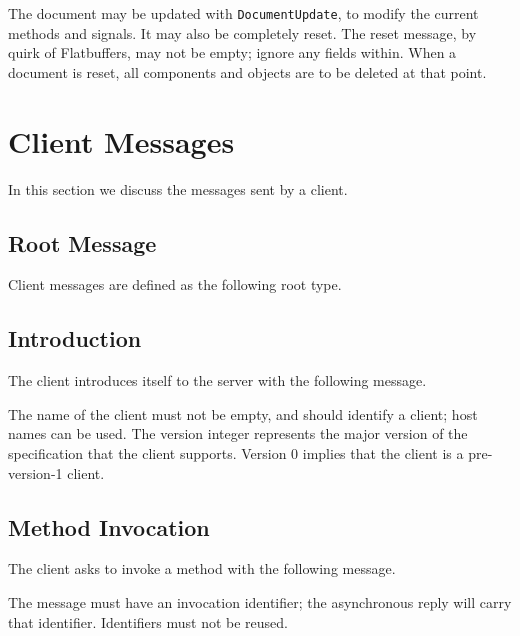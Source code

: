 \documentclass[11pt, oneside]{amsart}
\begin{document}
The document may be updated with \texttt{DocumentUpdate}, to modify the current methods and signals. It may also be completely reset. The reset message, by quirk of Flatbuffers, may not be empty; ignore any fields within. When a document is reset, all components and objects are to be deleted at that point.

\section{Client Messages}

In this section we discuss the messages sent by a client.

\subsection{Root Message}

Client messages are defined as the following root type.



\subsection{Introduction}

The client introduces itself to the server with the following message.



The name of the client must not be empty, and should identify a client; host names can be used. The version integer represents the major version of the specification that the client supports. Version 0 implies that the client is a pre-version-1 client.

\subsection{Method Invocation}
\label{sec:method_invoke}

The client asks to invoke a method with the following message.



The message must have an invocation identifier; the asynchronous reply will carry that identifier. Identifiers must not be reused.
\end{document}
